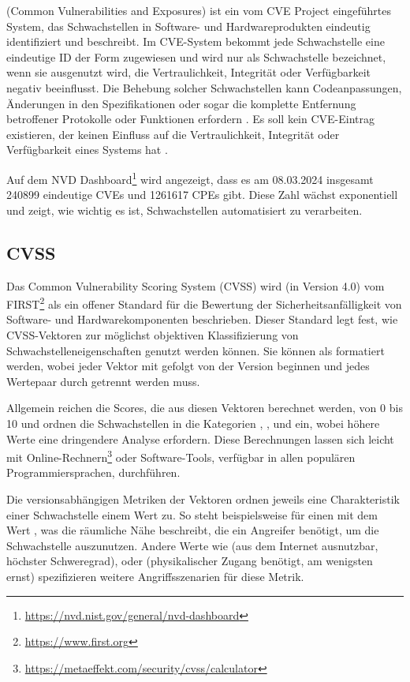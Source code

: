  (Common Vulnerabilities and Exposures) ist ein vom CVE Project eingeführtes System, das Schwachstellen in Software- und Hardwareprodukten eindeutig identifiziert und beschreibt.
Im CVE-System bekommt jede Schwachstelle eine eindeutige ID der Form  zugewiesen und wird nur als Schwachstelle bezeichnet, wenn sie ausgenutzt wird, die Vertraulichkeit, Integrität oder Verfügbarkeit negativ beeinflusst.
Die Behebung solcher Schwachstellen kann Codeanpassungen, Änderungen in den Spezifikationen oder sogar die komplette Entfernung betroffener Protokolle oder Funktionen erfordern \cite{nvdVulnerabilityDefinition}.
Es soll kein CVE-Eintrag existieren, der keinen Einfluss auf die Vertraulichkeit, Integrität oder Verfügbarkeit eines Systems hat \cite{nvdVulnerabilityMetrics}.

Auf dem NVD Dashboard\footnote{\url{https://nvd.nist.gov/general/nvd-dashboard}} wird angezeigt, dass es am 08.03.2024 insgesamt 240899 eindeutige CVEs und 1261617 CPEs gibt.
Diese Zahl wächst exponentiell und zeigt, wie wichtig es ist, Schwachstellen automatisiert zu verarbeiten.

\subsection{CVSS} \label{subsec:projektbericht-grundlagen-cvss}

Das Common Vulnerability Scoring System (CVSS) wird (in Version 4.0) \cite{CVSSv4.0Specification} vom FIRST\footnote{\url{https://www.first.org}} als ein offener Standard für die Bewertung der Sicherheitsanfälligkeit von Software- und Hardwarekomponenten beschrieben.
Dieser Standard legt fest, wie CVSS-Vektoren zur möglichst objektiven Klassifizierung von Schwachstelleneigenschaften genutzt werden können.
Sie können als  formatiert werden, wobei jeder Vektor mit  gefolgt von der Version beginnen und jedes Wertepaar durch \qt{/} getrennt werden muss.

Allgemein reichen die Scores, die aus diesen Vektoren berechnet werden, von 0 bis 10 und ordnen die Schwachstellen in die Kategorien , ,  und  ein, wobei höhere Werte eine dringendere Analyse erfordern.
Diese Berechnungen lassen sich leicht mit Online-Rechnern\footnote{\url{https://metaeffekt.com/security/cvss/calculator}} oder Software-Tools, verfügbar in allen populären Programmiersprachen, durchführen.

Die versionsabhängigen Metriken der Vektoren ordnen jeweils eine Charakteristik einer Schwachstelle einem Wert zu.
So steht beispielsweise  für einen  mit dem Wert , was die räumliche Nähe beschreibt, die ein Angreifer benötigt, um die Schwachstelle auszunutzen.
Andere Werte wie  (aus dem Internet ausnutzbar, höchster Schweregrad),  oder  (physikalischer Zugang benötigt, am wenigsten ernst) spezifizieren weitere Angriffsszenarien für diese Metrik.

